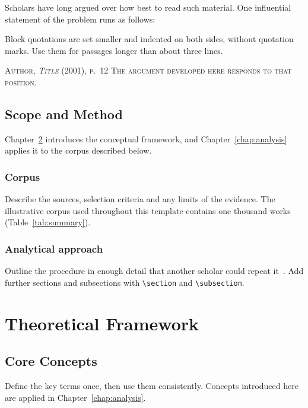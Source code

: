 \documentclass[12pt,a4paper,twoside,openright]{book}
\makeatletter
\numberwithin{equation}{chapter}
\renewenvironment{quote}
  {\list{}{\listparindent\z@\itemindent\z@\leftmargin2.2em\rightmargin2.2em\topsep0.8\baselineskip\parsep\z@\@plus\p@}\item\relax\small}
  {\endlist}
\makeatother
\begin{document}
Scholars have long argued over how best to read such material. One influential statement
of the problem runs as follows:
\begin{quote}
  Block quotations are set smaller and indented on both sides, without quotation marks.
  Use them for passages longer than about three lines.
  \par\raggedleft\upshape\scshape Author, \emph{Title} (2001), p.~12
\end{quote}
The argument developed here responds to that position.

\section{Scope and Method}\label{sec:scope}
Chapter~\ref{chap:framework} introduces the conceptual framework, and
Chapter~\ref{chap:analysis} applies it to the corpus described below.

\subsection{Corpus}\label{sec:corpus}
Describe the sources, selection criteria and any limits of the evidence. The illustrative
corpus used throughout this template contains one thousand works
(Table~\ref{tab:summary}).

\subsection{Analytical approach}
Outline the procedure in enough detail that another scholar could repeat it~\cite{jones2010}.
Add further sections and subsections with \verb|\section| and \verb|\subsection|.

\chapter{Theoretical Framework}\label{chap:framework}

\section{Core Concepts}
Define the key terms once, then use them consistently. Concepts introduced here are
applied in Chapter~\ref{chap:analysis}.
\end{document}

